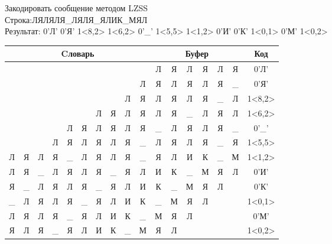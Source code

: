 \documentclass[a4paper, 12pt]{article}
\begin{document}
Закодировать сообщение методом LZSS\\
Строка:ЛЯЛЯЛЯ\_ЛЯЛЯ\_ЯЛИК\_МЯЛ\\
Результат: 0'Л' 0'Я' 1<8,2> 1<6,2> 0'\_' 1<5,5> 1<1,2> 0'И' 0'К' 1<0,1> 0'М' 1<0,2>\\
\begin{table}[h!]
\centering
\begin{tabular}{|c|c|c|c|c|c|c|c|c|c|c|c|c|c|c|c|c|}
\hline
\multicolumn{10}{|c|}{Cловарь} & \multicolumn{6}{c|}{Буфер} & Код  \\ \hline
  &   &   &   &   &   &   &   &   &   & Л & Я & Л & Я & Л & Я & 0'Л'\\ \hline
  &   &   &   &   &   &   &   &   & Л & Я & Л & Я & Л & Я & \_ & 0'Я'\\ \hline
  &   &   &   &   &   &   &   & \cellcolor[HTML]{FFFF00} Л & \cellcolor[HTML]{FFFF00} Я & \cellcolor[HTML]{FFFF00} Л & \cellcolor[HTML]{FFFF00} Я & Л & Я & \_ & Л & 1<8,2>\\ \hline
  &   &   &   &   &   & \cellcolor[HTML]{FFFF00} Л & \cellcolor[HTML]{FFFF00} Я & Л & Я & \cellcolor[HTML]{FFFF00} Л & \cellcolor[HTML]{FFFF00} Я & \_ & Л & Я & Л & 1<6,2>\\ \hline
  &   &   &   & Л & Я & Л & Я & Л & Я & \_ & Л & Я & Л & Я & \_ & 0'\_'\\ \hline
  &   &   & Л & Я & \cellcolor[HTML]{FFFF00} Л & \cellcolor[HTML]{FFFF00} Я & \cellcolor[HTML]{FFFF00} Л & \cellcolor[HTML]{FFFF00} Я & \cellcolor[HTML]{FFFF00} \_ & \cellcolor[HTML]{FFFF00} Л & \cellcolor[HTML]{FFFF00} Я & \cellcolor[HTML]{FFFF00} Л & \cellcolor[HTML]{FFFF00} Я & \cellcolor[HTML]{FFFF00} \_ & Я & 1<5,5>\\ \hline
Л & \cellcolor[HTML]{FFFF00} Я & \cellcolor[HTML]{FFFF00} Л & Я & \_ & Л & Я & Л & Я & \_ & \cellcolor[HTML]{FFFF00} Я & \cellcolor[HTML]{FFFF00} Л & И & К & \_ & М & 1<1,2>\\ \hline
Л & Я & \_ & Л & Я & Л & Я & \_ & Я & Л & И & К & \_ & М & Я & Л & 0'И'\\ \hline
Я & \_ & Л & Я & Л & Я & \_ & Я & Л & И & К & \_ & М & Я & Л &   & 0'К'\\ \hline
\cellcolor[HTML]{FFFF00} \_ & Л & Я & Л & Я & \_ & Я & Л & И & К & \cellcolor[HTML]{FFFF00} \_ & М & Я & Л &   &   & 1<0,1>\\ \hline
Л & Я & Л & Я & \_ & Я & Л & И & К & \_ & М & Я & Л &   &   &   & 0'М'\\ \hline
\cellcolor[HTML]{FFFF00} Я & \cellcolor[HTML]{FFFF00} Л & Я & \_ & Я & Л & И & К & \_ & М & \cellcolor[HTML]{FFFF00} Я & \cellcolor[HTML]{FFFF00} Л &   &   &   &   & 1<0,2>\\ \hline
\end{tabular}
\end{table}
\end{document}
